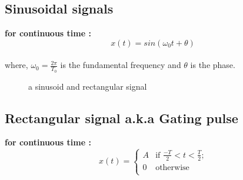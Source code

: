 \documentclass[a4paper,12pt]{book}
\begin{document}
\subsection*{Sinusoidal signals}
{\bf for continuous time :}\\
	 $$ x(t) = sin(\omega_0 t+ \theta)$$ \\
where, $\omega_0 = \frac{2\pi}{T_0}$ is the fundamental frequency and $\theta$ is the phase.\\
\begin{figure}[h]  
\centering 
{}
\caption{a sinusoid and rectangular signal} \label{fig:M}  
\end{figure}

\subsection*{ Rectangular signal a.k.a Gating pulse}
{\bf for continuous time :}\\
	\[ x(t) = \left\{ \begin{array}{ll}

	A & \mbox{if $\frac{-T}{2}< t <\frac{T}{2}$;} \\

	0 & \mbox{otherwise} \\
	\end{array}
	\right. \]
\pagebreak
\end{document}
